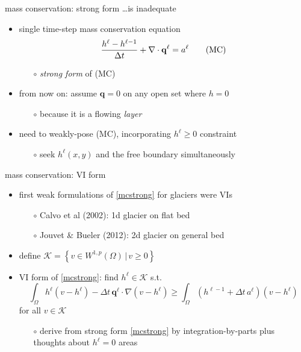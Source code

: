 \documentclass[xcolor={dvipsnames}]{beamer}
\newcommand\bq{\mathbf{q}}
\newcommand\grad{\nabla}
\begin{document}
\begin{frame}{mass conservation: strong form \dots is inadequate}

\begin{itemize}
\item single time-step mass conservation equation
\begin{equation}
\singletsmc \tag{MC} \label{mcstrong}
\end{equation}
    \begin{itemize}
    \item[$\circ$] \emph{strong form} of (MC)
    \end{itemize}
\item from now on: assume $\bq=0$ on any open set where $h=0$
    \begin{itemize}
    \item[$\circ$] because it is a flowing \emph{layer}
    \end{itemize}

\bigskip
\item \alert{need to weakly-pose (MC), incorporating $h^\ell\ge 0$ constraint}
    \begin{itemize}
    \item[$\circ$] seek $h^\ell(x,y)$ and the free boundary simultaneously
    \end{itemize}
\end{itemize}
\end{frame}


\begin{frame}{mass conservation: VI form}

\begin{itemize}
\item first weak formulations of \eqref{mcstrong} for glaciers were VIs
    \begin{itemize}
    \item[$\circ$] Calvo et al (2002): 1d glacier on flat bed
    \item[$\circ$] Jouvet \& Bueler (2012): 2d glacier on general bed
    \end{itemize}
\item define $\mathcal{K} = \left\{v \in W^{1,p}(\Omega) \,\Big|\, v\ge 0\right\}$
\item VI form of \eqref{mcstrong}: \quad find $h^\ell\in\mathcal{K}$ s.t.
    $$\int_\Omega h^\ell (v - h^\ell) - \Delta t\, \bq^\ell \cdot \grad(v - h^\ell) \ge \int_\Omega \left(h^{\ell-1} + \Delta t\, a^\ell\right) (v - h^\ell)$$
for all $v \in \mathcal{K}$
    \begin{itemize}
    \item[$\circ$] derive from strong form \eqref{mcstrong} by integration-by-parts plus thoughts about $h^\ell=0$ areas
    \end{itemize}
\end{itemize}
\end{frame}
\end{document}
